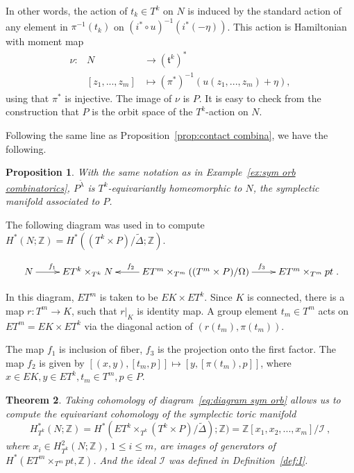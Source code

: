 \documentclass[12pt]{amsart}
\def\Z {{\mathbb{Z}}}
\def\I {{\mathcal{I}}}
\newtheorem{theorem}{Theorem}[section]
\newtheorem{proposition}[theorem]{Proposition}
\theoremstyle{definition}
\numberwithin{equation}{section}
\begin{document}
In other words, the action of $t_{k}\in T^k$ on $N$ is induced by
the standard action of any element in $\pi^{-1}(t_{k})$ on
$(i^*\circ u)^{-1}(i^{*}(-\eta))$. This action is Hamiltonian with
moment map
\begin{eqnarray}\label{eq:moment map}
\nu: & N& \rightarrow  (\mathfrak{t}^k)^{*}\\
&[z_{1},...,z_{m}]& \mapsto (\pi^{*})^{-1}(u(z_{1},...,z_{m})+\eta),
\end{eqnarray}
using that $\pi^{*}$ is injective. The image of $\nu$ is $P$. It is
easy to check from the construction that $P$ is the orbit space of
the $T^k$-action on $N$.

Following the same line as Proposition~\ref{prop:contact combina},
we have the following.

\begin{proposition}\label{prop: DJ construction is OK for sym orb}
With the same notation as in Example~\ref{ex:sym orb combinatorics},
$P^{\tilde{\lambda}}$ is $T^{k}$-equivariantly homeomorphic to $N$,
the symplectic manifold associated to $P$.
\end{proposition}

The following diagram was used in \cite{DJ} to compute
$H^{*}(N;\Z)=H^{*}((T^k\times P)/\tilde{\Delta};\Z)$.


\begin{equation}\label{eq:diagram sym orb} \xymatrix{
N\ar[r]^(0.4){f_1} & ET^k\times_{T^k}N & ET^m\times_{T^m}((T^m\times
P)/\Omega) \ar[l]_(0.6){f_2} \ar[r]^(0.6){f_3} &
ET^m\times_{T^m}pt}.
\end{equation}

In this diagram, $ET^m$ is taken to be $EK\times ET^k$. Since $K$ is
connected, there is a map $r: T^m\rightarrow K$, such that $r|_{K}$
is identity map. A group element  $t_m \in T^m$  acts on
$ET^m=EK\times ET^k$ via the diagonal action of $(r(t_m),\pi(t_m))$.

The map $f_1$ is inclusion of fiber, $f_3$ is the projection onto
the first factor. The map $f_2$ is given by $[(x,y),[t_m, p]]\mapsto
[y,[\pi(t_m),p]]$, where $x\in EK, y\in ET^k, t_m\in T^m, p\in P$.

\begin{theorem}\cite{DJ}\label{thm:symp orbi equi cohomology}
Taking cohomology of diagram~\eqref{eq:diagram sym orb} allows us to
compute the equivariant cohomology of the symplectic toric manifold
\begin{equation}
H_{T^k}^{*}(N;\Z)=H^{*}(ET^k\times_{T^k}(T^k\times
P)/\tilde{\Delta});\Z)= \Z[x_{1},x_{2},...,x_{m}]/\I\ ,
\end{equation}
where $x_{i}\in H_{T^k}^{2}(N;\Z)$, $1\leq i\leq m$, are images of
generators of $H^{*}(ET^m\times_{T^m}pt, \Z)$. And the ideal $\I$
was defined in Definition~\ref{def:I}.
\end{theorem}
\end{document}
